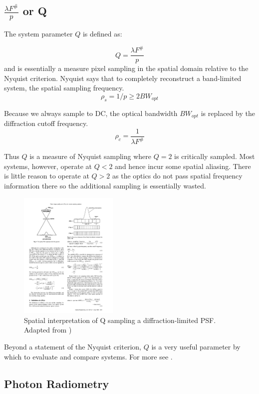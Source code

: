 \documentclass[10pt,journal]{IEEEtran}  %
\begin{document}
{\subsection{$\frac{\lambda F^\#}{p}$ or Q}
\label{sec:q}

The system parameter $Q$ is defined as:

\begin{equation}
Q = \frac{\lambda F^\#}{p}
\label{eq:Q}
\end{equation}
and is essentially a measure pixel sampling in the spatial domain relative to the Nyquist criterion.  Nyquist says that to completely reconstruct a band-limited system, the spatial sampling frequency. 
$$\rho_s = 1/p \geq 2 BW_{opt}$$

Because we always sample to DC, the optical bandwidth $BW_{opt}$ is replaced by the diffraction cutoff frequency.
$$\rho_c = \frac{1}{\lambda F^\#}$$

Thus $Q$ is a measure of Nyquist sampling where $Q=2$ is critically sampled.  Most systems, however, operate at $Q < 2$ and hence incur some spatial aliasing.  There is little reason to operate at $Q > 2$ as the optics do not pass spatial frequency information there so the additional sampling is essentially wasted.

\begin{figure}[h!]
\includegraphics[width=0.42\textwidth]{figures/Q_fiete.pdf}
\caption{Spatial interpretation of Q sampling a diffraction-limited PSF.  Adapted from \cite{fiete_q})}
\end{figure} 

Beyond a statement of the Nyquist criterion, $Q$ is a very useful parameter by which to evaluate and compare systems.  For more see \cite{fiete_q}.  

\subsection{Photon Radiometry}

}
\end{document}
